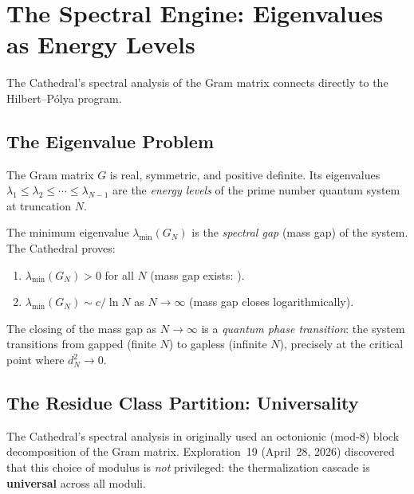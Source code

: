 \section{The Spectral Engine: Eigenvalues as Energy Levels}
\label{sec:spectral}

The Cathedral's spectral analysis of the Gram matrix connects directly
to the Hilbert--P\'olya program.

\subsection{The Eigenvalue Problem}

The Gram matrix $G$ is real, symmetric, and positive definite. Its
eigenvalues $\lambda_1 \leq \lambda_2 \leq \cdots \leq \lambda_{N-1}$
are the \emph{energy levels} of the prime number quantum system at
truncation $N$.

\begin{correspondence}[Spectral Gap = Mass Gap]
The minimum eigenvalue $\lambda_{\min}(G_N)$ is the \emph{spectral gap}
(mass gap) of the system. The Cathedral proves:
\begin{enumerate}
  \item $\lambda_{\min}(G_N) > 0$ for all $N$ (mass gap exists:
    ).
  \item $\lambda_{\min}(G_N) \sim c/\ln N$ as $N \to \infty$
    (mass gap closes logarithmically).
\end{enumerate}
The closing of the mass gap as $N \to \infty$ is a \emph{quantum
phase transition}: the system transitions from gapped (finite $N$)
to gapless (infinite $N$), precisely at the critical point where
$d_N^2 \to 0$.
\end{correspondence}

\subsection{The Residue Class Partition: Universality}
\label{sec:universality}

The Cathedral's spectral analysis in 
originally used an octonionic (mod-8) block decomposition of the Gram matrix.
Exploration~19 (April~28, 2026) discovered that this choice of modulus is
\emph{not} privileged: the thermalization cascade is \textbf{universal}
across all moduli.

